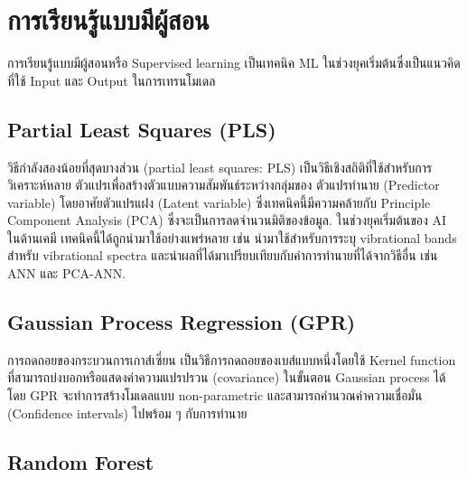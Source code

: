 

\chapter{การเรียนรู้แบบมีผู้สอน}
\label{ch:sup_ml}

การเรียนรู้แบบมีผู้สอนหรือ Supervised learning เป็นเทคนิค ML ในช่วงยุคเริ่มต้นซึ่งเป็นแนวคิดที่ใช้ Input และ Output ในการเทรนโมเดล

\section{Partial Least Squares (PLS)}

วิธีกำลังสองน้อยที่สุดบางส่วน (partial least squares: PLS) 
เป็นวิธีเชิงสถิติที่ใช้สำหรับการวิเคราะห์หลาย ตัวแปรเพื่อสร้างตัวแบบความสัมพันธ์ระหว่างกลุ่มของ ตัวแปรทำนาย (Predictor variable) 
โดยอาศัยตัวแปรแฝง (Latent variable) ซึ่งเทคนิคนี้มีความคล้ายกับ Principle Component Analysis (PCA) 
ซึ่งจะเป็นการลดจำนวนมิติของข้อมูล.\cite{wold1984} ในช่วงยุคเริ่มต้นของ AI ในด้านเคมี เทคนิคนี้ได้ถูกนำมาใช้อย่างแพร่หลาย เช่น 
นำมาใช้สำหรับการระบุ vibrational bands สำหรับ vibrational spectra และนำผลที่ได้มาเปรียบเทียบกับค่าการทำนายที่ได้จากวิธีอื่น เช่น
ANN และ PCA-ANN.

\section{Gaussian Process Regression (GPR)}

การถดถอยของกระบวนการเกาส์เซี่ยน เป็นวิธีการถดถอยของเบส์แบบหนึ่งโดยใช้ Kernel function ที่สามารถบ่งบอกหรือแสดงค่าความแปรปรวน (covariance) 
ในขั้นตอน Gaussian process ได้\cite{rasmussen2005} โดย GPR จะทำการสร้างโมเดลแบบ non-parametric และสามารถคำนวณค่าความเชื่อมั่น 
(Confidence intervals) ไปพร้อม ๆ กับการทำนาย

\section{Random Forest}

